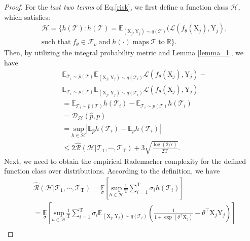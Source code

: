 \begin{proof}
For the \textit{last two terms} of Eq.\ref{risk}, we first define a function class $\mathcal{H}$, which satisfies:
\begin{equation*}
\begin{aligned}
    &\mathcal{H}=\{h(\mathcal{T}):h(\mathcal{T})=\mathbb E_{(\mathrm{X}_j,\mathrm{Y}_j)\sim q(\mathcal{T})}(\mathcal{L}(f_\theta(\mathrm{X}_j),\mathrm{Y}_j), \\ &\text{such that}\; f_\theta \in \mathcal{F}_\nu \;\text{and}\; h(\cdot)\; \text{maps}\; \mathcal{T}\; \text{to}\; \mathbb{R}\}.
\end{aligned}
\end{equation*}
Then, by utilizing the integral probability metric and Lemma \ref{lemma_1}, we have
\begin{equation}
\begin{aligned}
    &\mathbb E_{\mathcal{T}_i\sim \hat{p}(\mathcal{T})}\mathbb E_{(\mathrm{X}_j,\mathrm{Y}_j)\sim q(\mathcal{T}_i)}\mathcal{L}(f_\theta(\mathrm{X}_j),\mathrm{Y}_j) - \\
    &\mathbb E_{\mathcal{T}_i\sim p(\mathcal{T})}\mathbb E_{(\mathrm{X}_j,\mathrm{Y}_j)\sim q(\mathcal{T}_i)}\mathcal{L}(f_\theta(\mathrm{X}_j),\mathrm{Y}_j) \\
    &=\mathbb E_{\mathcal{T}_i\sim \hat{p}(\mathcal{T})}h(\mathcal{T}_i) - \mathbb E_{\mathcal{T}_i\sim p(\mathcal{T})}h(\mathcal{T}_i) \\ 
    &= \mathcal{D}_{\mathcal{H}}(\hat{p},p) \\
    &=\underset{h\in\mathcal{H}}{\text{sup}}\left|\mathbb E_{\hat{p}}h(\mathcal{T}_i) - \mathbb E_{p} h(\mathcal{T}_i)\right| \\
    &\leq 2\hat{\mathcal{R}}(\mathcal{H}|\mathcal{T}_1,\cdots,\mathcal{T}_\mathrm{T}) + 3\sqrt{\frac{\log(2/\epsilon)}{2\mathrm{T}}}.
\end{aligned}
\end{equation}
Next, we need to obtain the empirical Rademacher complexity for the defined function class over distributions. According to the definition, we have
\begin{equation}
\label{lad}
\begin{aligned}
    &\hat{\mathcal{R}}(\mathcal{H}|\mathcal{T}_1,\cdots,\mathcal{T}_\mathrm{T}) = \underset{\sigma}{\mathbb E} \left[\underset{h\in\mathcal{H}}{\text{sup}}\frac{1}{\mathrm{T}}\sum_{i=1}^\mathrm{T}\sigma_ih(\mathcal{T}_i)\right]\\
    &=\underset{\sigma}{\mathbb E} \left[\underset{h\in\mathcal{H}}{\text{sup}}\frac{1}{\mathrm{T}}\sum_{i=1}^\mathrm{T}\sigma_i \mathbb E_{(\mathrm{X}_j,\mathrm{Y}_j) \sim q(\mathcal{T}_i)}\left(\frac{1}{1+\exp{(\theta^\top\mathrm{X}_j)}}-\theta^\top\mathrm{X}_j\mathrm{Y}_j\right)\right] \\

\end{aligned}
\end{equation}
\end{proof}
